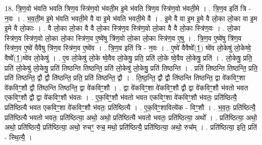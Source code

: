 \documentclass[17pt]{extarticle}
\begin{document}
18. त्रि॒ण॒वो भ॑वति भवति त्रिण॒व स्त्रि॑ण॒वो भ॑वती॒म इ॒मे भ॑वति त्रिण॒व स्त्रि॑ण॒वो भ॑वती॒मे । . त्रि॒ण॒व इति॑ त्रि - न॒वः । . भ॒व॒ती॒म इ॒मे भ॑वति भवती॒मे वै वा इ॒मे भ॑वति भवती॒मे वै । . इ॒मे वै वा इ॒म इ॒मे वै लो॒का लो॒का वा इ॒म इ॒मे वै लो॒काः । . वै लो॒का लो॒का वै वै लो॒का स्त्रि॑ण॒व स्त्रि॑ण॒वो लो॒का वै वै लो॒का स्त्रि॑ण॒वः । . लो॒का स्त्रि॑ण॒व स्त्रि॑ण॒वो लो॒का लो॒का स्त्रि॑ण॒व ए॒ष्वे॑षु त्रि॑ण॒वो लो॒का लो॒का स्त्रि॑ण॒व ए॒षु । . त्रि॒ण॒व ए॒ष्वे॑षु त्रि॑ण॒व स्त्रि॑ण॒व ए॒ष्वे॑ वैवैषु त्रि॑ण॒व स्त्रि॑ण॒व ए॒ष्वे॑व । . त्रि॒ण॒व इति॑ त्रि - न॒वः । . ए॒ष्वे॑ वैवैष्वे᳚(1॒) ष्वे॑व लो॒केषु॑ लो॒केष्वे॒ वैष्वे᳚(1॒)ष्वे॑व लो॒केषु॑ । . ए॒व लो॒केषु॑ लो॒के ष्वे॒वैव लो॒केषु॒ प्रति॒ प्रति॑ लो॒के ष्वे॒वैव लो॒केषु॒ प्रति॑ । . लो॒केषु॒ प्रति॒ प्रति॑ लो॒केषु॑ लो॒केषु॒ प्रति॑ तिष्ठन्ति तिष्ठन्ति॒ प्रति॑ लो॒केषु॑ लो॒केषु॒ प्रति॑ तिष्ठन्ति । . प्रति॑ तिष्ठन्ति तिष्ठन्ति॒ प्रति॒ प्रति॑ तिष्ठन्ति॒ द्वौ द्वौ ति॑ष्ठन्ति॒ प्रति॒ प्रति॑ तिष्ठन्ति॒ द्वौ । . ति॒ष्ठ॒न्ति॒ द्वौ द्वौ ति॑ष्ठन्ति तिष्ठन्ति॒ द्वा वे॑कविꣳ॒॒शा वे॑कविꣳ॒॒शौ द्वौ ति॑ष्ठन्ति तिष्ठन्ति॒ द्वा वे॑कविꣳ॒॒शौ । . द्वा वे॑कविꣳ॒॒शा वे॑कविꣳ॒॒शौ द्वौ द्वा वे॑कविꣳ॒॒शौ भ॑वतो भवत एकविꣳ॒॒शौ द्वौ द्वा वे॑कविꣳ॒॒शौ भ॑वतः । . ए॒क॒विꣳ॒॒शौ भ॑वतो भवत एकविꣳ॒॒शा वे॑कविꣳ॒॒शौ भ॑वतः॒ प्रति॑ष्ठित्यै॒ प्रति॑ष्ठित्यै भवत एकविꣳ॒॒शा वे॑कविꣳ॒॒शौ भ॑वतः॒ प्रति॑ष्ठित्यै । . ए॒क॒विꣳ॒॒शावित्ये॑क - विꣳ॒॒शौ । . भ॒व॒तः॒ प्रति॑ष्ठित्यै॒ प्रति॑ष्ठित्यै भवतो भवतः॒ प्रति॑ष्ठित्या॒ अथो॒ अथो॒ प्रति॑ष्ठित्यै भवतो भवतः॒ प्रति॑ष्ठित्या॒ अथो᳚ । . प्रति॑ष्ठित्या॒ अथो॒ अथो॒ प्रति॑ष्ठित्यै॒ प्रति॑ष्ठित्या॒ अथो॒ रुचꣳ॒॒ रुच॒ मथो॒ प्रति॑ष्ठित्यै॒ प्रति॑ष्ठित्या॒ अथो॒ रुच᳚म् । . प्रति॑ष्ठित्या॒ इति॒ प्रति॑ - स्थि॒त्यै॒ । \newline
\end{document}
